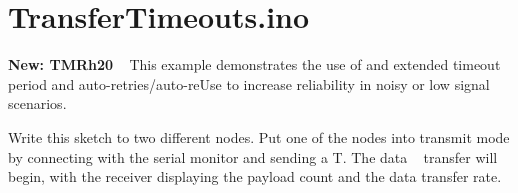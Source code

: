 \hypertarget{TransferTimeouts_8ino-example}{}\section{Transfer\+Timeouts.\+ino}
{\bfseries New\+: T\+M\+Rh20 }~\newline
 This example demonstrates the use of and extended timeout period and auto-\/retries/auto-\/re\+Use to increase reliability in noisy or low signal scenarios. ~\newline


Write this sketch to two different nodes. Put one of the nodes into \textquotesingle{}transmit\textquotesingle{} mode by connecting with the serial monitor and sending a \textquotesingle{}T\textquotesingle{}. The data ~\newline
 transfer will begin, with the receiver displaying the payload count and the data transfer rate.


